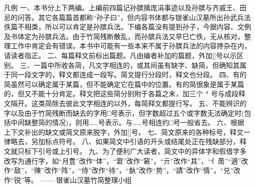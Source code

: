 \documentclass[12pt,UTF8]{ctexbook}
\begin{document}
凡例
一、本书分上下两编。上编前四篇记孙膑擒庞涓事迹以及孙膑与齐威王、田忌的问答。其它各篇篇首都称“孙子曰”，但内容书体都与银雀山汉墓所出孙武兵法佚篇不相类，所以可以肯定是孙膑兵法。下编各篇没有提到孙子，今据内容、文例及书体定为孙膑兵法。由于竹简残断散乱，而孙膑兵法又早巳亡佚，无从核对，整理工作中肯定会有错误。本书中可能有一些本来不属于孙膑兵法的内容搀杂在内，请读者指正。
二、每篇释文前标出篇题。凡由编者补加的篇题，外加[]号以示区别。
三、一篇中所收各简，凡文字相连的，或其间虽有缺字、缺简，但确知其属于同一段文字的，释文都连成一段写。简文提行分段时，释文也分段。
四、有的简虽然可以确定属于某篇，但不能确定它在篇中的位置。有的简很象是属于某篇的，但又不能十分肯定。释文把这些简分别附于各篇之末，加三个 * 号与成段释文隔开。这类简除去彼此文字相连的以外，每简释文都提行写。
五、不能辨识的字以及由于竹简残断而缺去的字用□号表示，但字数超过五个或字数无法确定时(包括中间缺整简的情况)，则用……号表示。与……号相连约□号一般省去。
六、根据上下文补出的缺文或简文原来脱字，外加[]号。
七、简文原来的各种标号，释文一律略去，另加标点符号。
八、如果简文中引语的开头或结尾处正在残缺部分，释文就只标下引号或上引号。
九、为了便利广大读者，简文中的异体字和假借字多改写为通行字，如“{月豊}”改作“体”，“宭”改作“窘”，“亓”改作“其”，“{亻啇}”“適”改作“敌”，“陳”改作“阵”，“侍”改作“待”，“埶”改作“势”，“請”改作“情”，“兑”改作“锐”等。
—— 银雀山汉墓竹简整理小组
\end{document}
